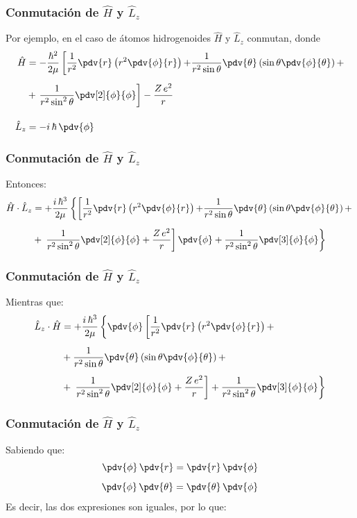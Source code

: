 \begin{frame}
\frametitle{Conmutación de $\hat{H}$ y $\hat{L}_{z}$}
Por ejemplo, en el caso de átomos hidrogenoides $\hat{H}$ y $\hat{L}_{z}$ conmutan, donde
\fontsize{12}{12}\selectfont
\begin{align*}
\hat{H} &= - \dfrac{\hbar^{2}}{2 \mu} \left[ \dfrac{1}{r^{2}} \pdv{r} \left( r^{2} \pdv{\phi}{r} \right) {+} \dfrac{1}{r^{2} \sin \theta} \pdv{\theta} \left( \sin \theta \pdv{\phi}{\theta} \right) {+} \right. \\[0.5em]
&+ \left. \dfrac{1}{r^{2} \sin^{2} \theta} \pdv[2]{\phi}{\phi} \right] - \dfrac{Z \, e^{2}}{r} \\[1em]
\hat{L}_{z} &= - i \, \hbar \, \pdv{\phi}
\end{align*}
\end{frame}
\begin{frame}
\frametitle{Conmutación de $\hat{H}$ y $\hat{L}_{z}$}
Entonces:
\fontsize{12}{12}\selectfont
\begin{align*}
\hat{H} \cdot \hat{L}_{z} &= + \dfrac{i \, \hbar^{3}}{2 \mu} \left\{ \left[ \dfrac{1}{r^{2}} \pdv{r} \left( r^{2} \pdv{\phi}{r} \right) {+} \dfrac{1}{r^{2} \sin \theta} \pdv{\theta} \left( \sin \theta \pdv{\phi}{\theta} \right) {+} \right. \right. \\[0.5em]
&+ \left. \left. \dfrac{1}{r^{2} \sin^{2} \theta} \pdv[2]{\phi}{\phi} + \dfrac{Z \, e^{2}}{r} \right] \pdv{\phi} + \dfrac{1}{r^{2} \sin^{2} \theta} \pdv[3]{\phi}{\phi} \right\}
\end{align*}
\end{frame}
\begin{frame}
\frametitle{Conmutación de $\hat{H}$ y $\hat{L}_{z}$}
Mientras que:
\fontsize{12}{12}\selectfont
\begin{align*}
\hat{L}_{z} \cdot \hat{H}  &= + \dfrac{i \, \hbar^{3}}{2 \mu} \left\{ \pdv{\phi} \left[ \dfrac{1}{r^{2}} \pdv{r} \left( r^{2} \pdv{\phi}{r} \right) {+} \right. \right. \\[0.5em]
&+ \dfrac{1}{r^{2} \sin \theta} \pdv{\theta} \left( \sin \theta \pdv{\phi}{\theta} \right) {+} \\[0.5em]
&+ \left. \left. \dfrac{1}{r^{2} \sin^{2} \theta} \pdv[2]{\phi}{\phi} + \dfrac{Z \, e^{2}}{r} \right] + \dfrac{1}{r^{2} \sin^{2} \theta} \pdv[3]{\phi}{\phi} \right\}
\end{align*}
\end{frame}
\begin{frame}
\frametitle{Conmutación de $\hat{H}$ y $\hat{L}_{z}$}
Sabiendo que:
\begin{align*}
\pdv{\phi} \, \pdv{r} = \pdv{r} \, \pdv{\phi} \\[0.5em]
\pdv{\phi} \, \pdv{\theta} = \pdv{\theta} \, \pdv{\phi}
\end{align*}
Es decir, las dos expresiones son iguales, por lo que:
\end{frame}

